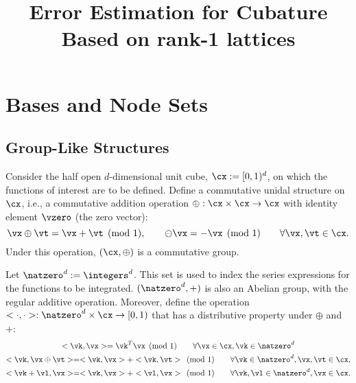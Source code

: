 \documentclass[]{elsarticle}
\theoremstyle{definition}
\renewcommand{\bbK}{\natzero^d}
\begin{document}
\begin{frontmatter}

\title{Error Estimation for Cubature Based on rank-1 lattices}
\address{Room E1-208, Department of Applied Mathematics, Illinois Institute of Technology,\\ 10 W.\ 32$^{\text{nd}}$ St., Chicago, IL 60616}
\begin{abstract}
\end{abstract}

\begin{keyword}


\end{keyword}
\end{frontmatter}

\section{Bases and Node Sets}

\subsection{Group-Like Structures}
Consider the half open $d$-dimensional unit cube, $\cx:=[0,1)^d$, on which the functions of interest are to be defined. Define a commutative unidal structure on $\cx$, i.e., a commutative addition operation $\oplus:\cx \times \cx \to \cx$ with identity element $\vzero$ (the zero vector):
\[
\vx \oplus \vt = \vx + \vt \pmod 1, \qquad \ominus \vx = -\vx \pmod 1 \qquad \forall \vx, \vt \in \cx.
\]
Under this operation, $(\cx,\oplus)$ is a commutative group.

Let $\bbK:=\integers^d$. This set is used to index the series expressions for the functions to be integrated.  $(\bbK,+)$ is also an Abelian group, with the regular additive operation.  Moreover, define the operation $<\cdot,\cdot>: \bbK \times \cx \to [0,1)$ that has a distributive property under $\oplus$ and $+$:
\begin{subequations} \label{distrib}
\begin{gather}
<\vk,\vx> = \vk^T \vx \pmod 1 \qquad \forall \vx \in \cx, \vk \in \bbK \\
<\vk,\vx \oplus \vt> = <\vk,\vx> + <\vk,\vt> \pmod 1 \qquad \forall \vk \in \bbK, \vx, \vt \in \cx, \\
<\vk + \vl,\vx> = <\vk,\vx> + <\vl,\vx> \pmod 1 \qquad \forall \vk,\vl \in \bbK, \vx \in \cx.
\end{gather}
\end{subequations}
\end{document}
